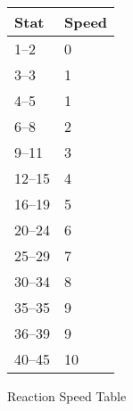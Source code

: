 \begin{SHTable}[h]
	\begin{tabular}{ll}
	Stat    & Speed \\
	\hline
	1--2	& 0		   \\
	3--3	& 1		   \\
	4--5	& 1		   \\
	6--8	& 2		   \\
	9--11	& 3		   \\
	12--15  & 4		   \\
	16--19  & 5		   \\
	20--24  & 6		   \\
	25--29  & 7		   \\
	30--34  & 8		   \\
	35--35  & 9		   \\
	36--39  & 9		   \\ 
	40--45  & 10	   \\ 
    \end{tabular}
    \caption{Reaction Speed Table} \label{Table:Speed}
\end{SHTable}
